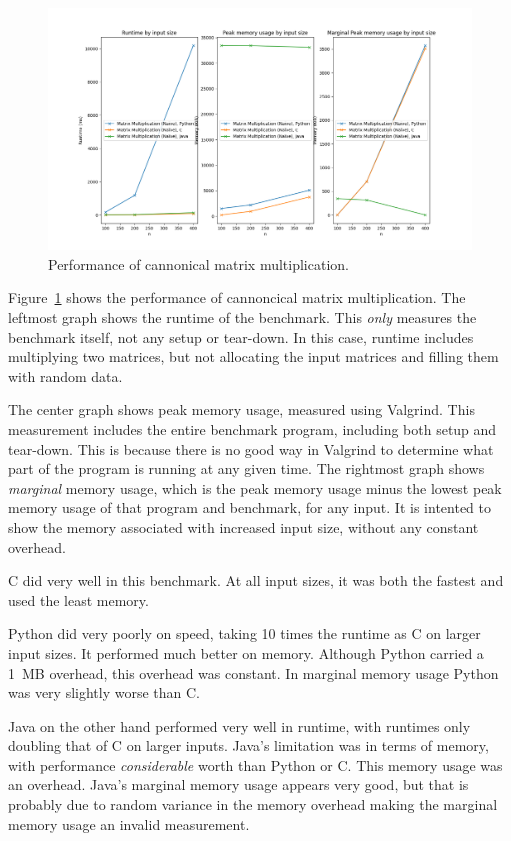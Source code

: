 \documentclass[12pt,letterpaper]{article}
\begin{document}
\begin{figure}[h!]
  \centering
  \includegraphics[width=\textwidth]{./matmul_naïve-plot.png}
  \caption{Performance of cannonical matrix multiplication.}
  \label{plot-matmul-cannonical}
\end{figure}

Figure~\ref{plot-matmul-cannonical} shows the performance of cannoncical matrix
multiplication. The leftmost graph shows the runtime of the benchmark. This
\emph{only} measures the benchmark itself, not any setup or tear-down. In this
case, runtime includes multiplying two matrices, but not allocating the input
matrices and filling them with random data.

The center graph shows peak memory usage, measured using Valgrind. This
measurement includes the entire benchmark program, including both setup and
tear-down. This is because there is no good way in Valgrind to determine what
part of the program is running at any given time. The rightmost graph shows
\emph{marginal} memory usage, which is the peak memory usage minus the lowest
peak memory usage of that program and benchmark, for any input. It is intented
to show the memory associated with increased input size, without any constant
overhead.

C did very well in this benchmark. At all input sizes, it was both the fastest
and used the least memory.

Python did very poorly on speed, taking 10 times the runtime as C on larger
input sizes. It performed much better on memory. Although Python carried a
\SI{1}{\mega B} overhead, this overhead was constant. In marginal memory usage
Python was very slightly worse than C.

Java on the other hand performed very well in runtime, with runtimes only
doubling that of C on larger inputs. Java's limitation was in terms of memory,
with performance \emph{considerable} worth than Python or C. This memory usage
was an overhead. Java's marginal memory usage appears very good, but that is
probably due to random variance in the memory overhead making the marginal
memory usage an invalid measurement.
\end{document}
